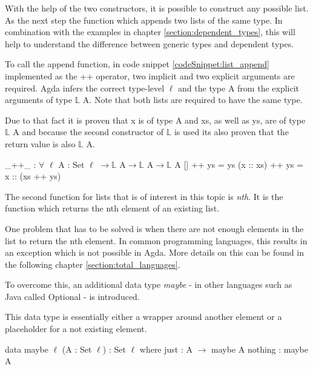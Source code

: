 With the help of the two constructors, it is possible to construct any possible list. As the next step the function which appends two lists of the same type. In combination with the examples in chapter \ref{section:dependent_types}, this will help to understand the difference between generic types and dependent types.

To call the append function, in code snippet \ref{codeSnippet:list_append} implemented as the ++ operator, two implicit and two explicit arguments are required. 
Agda infers the correct type-level $\ell$ and the type A from the explicit arguments of type $\mathbb{L}$ A. 
Note that both lists are required to have the same type.

Due to that fact it is proven that x is of type A and xs, as well as ys, are of type $\mathbb{L}$ A and 
because the second constructor of $\mathbb{L}$ is used its also proven that the return value is also $\mathbb{L}$ A.

\begin{codesnippet}[mathescape=true, caption={Definition of the list append function in Agda}, label={codeSnippet:list_append}]
_++_ : $\forall$ {$\ell$} {A : Set $\ell$} $\rightarrow \mathbb{L}$ A$\rightarrow \mathbb{L}$ A$\rightarrow \mathbb{L}$ A
  []        ++ ys = ys
  (x :: xs) ++ ys = x :: (xs ++ ys)
\end{codesnippet}

The second function for lists that is of interest in this topic is \emph{nth}.
It is the function which returns the nth element of an existing list.

One problem that has to be solved is when there are not enough elements in the list to return the nth element. 
In common programming languages, this results in an exception which is not possible in Agda.
More details on this can be found in the following chapter \ref{section:total_languages}.

To overcome this, an additional data type \emph{maybe} - in other languages such as Java called Optional - is introduced.

This data type is essentially either a wrapper around another element or a placeholder for a not existing element.

\begin{codesnippet}[mathescape=true, caption={Definition of the maybe datatype in Agda}, label={codeSnippet:maybe_datatype}]
data maybe {$\ell$} (A : Set $\ell$) : Set $\ell$ where
  just : A $\rightarrow$ maybe A
  nothing : maybe A
\end{codesnippet}


